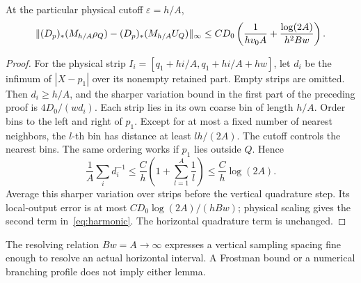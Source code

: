 \begin{lemma}\label{lem:harmonic}
At the particular physical cutoff $\varepsilon=h/A$,
\begin{equation}\label{eq:harmonic}
 \lVert (D_p)_*(M_{h/A}\rho_Q)-(D_p)_*(M_{h/A}U_Q)\rVert_\infty
 \leq C D_0\left(\frac1{hv_0A}
              +\frac{\log(2A)}{h^2Bw}\right).
\end{equation}
\end{lemma}
\begin{proof}
For the physical strip
$I_i=[q_1+hi/A,q_1+hi/A+hw]$, let $d_i$ be the infimum of
$|X-p_1|$ over its nonempty retained part. Empty strips are omitted.
Then $d_i\geq h/A$, and the sharper variation bound in the first part
of the preceding proof is $4D_0/(wd_i)$. Each strip lies in its own
coarse bin of length $h/A$. Order bins to the left and right of $p_1$.
Except for at most a fixed number of nearest neighbors, the $l$-th bin
has distance at least $lh/(2A)$. The cutoff controls the nearest bins.
The same ordering works if $p_1$ lies outside $Q$. Hence
\begin{equation}\label{eq:harmonic-sum}
 \frac1A\sum_i d_i^{-1}
 \leq\frac Ch\left(1+\sum_{l=1}^A\frac1l\right)
 \leq\frac Ch\log(2A).
\end{equation}
Average this sharper variation over strips before the vertical quadrature
step. Its local-output error is at most $CD_0\log(2A)/(hBw)$;
physical scaling gives the second term in~\eqref{eq:harmonic}.
The horizontal quadrature term is unchanged.
\end{proof}
The resolving relation $Bw=A\to\infty$ expresses a vertical sampling
spacing fine enough to resolve an actual horizontal interval. A Frostman
bound or a numerical branching profile does not imply either lemma.
